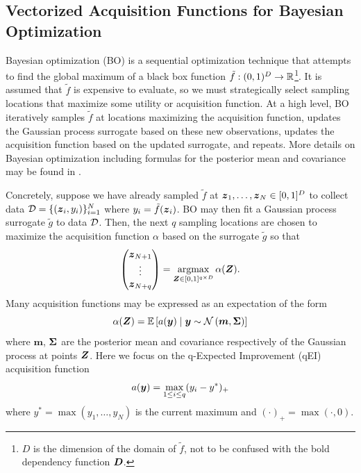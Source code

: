 \documentclass{article}[12pt]
\begin{document}



\subsection{Vectorized Acquisition Functions for Bayesian Optimization}

Bayesian optimization (BO) is a sequential optimization technique that attempts to find the global maximum of a black box function $\tilde{f}: (0,1)^{D} \to \mathbb{R}$\footnote{$D$ is the dimension of the domain of $\tilde{f}$, not to be confused with the bold dependency function $\boldsymbol{D}$.}. It is assumed that $\tilde{f}$ is expensive to evaluate, so we must strategically select sampling locations that maximize some utility or acquisition function. At a high level, BO iteratively samples $\tilde{f}$ at locations maximizing the acquisition function, updates the Gaussian process surrogate based on these new observations, updates the acquisition function based on the updated surrogate, and repeats. More details on Bayesian optimization including formulas for the posterior mean and covariance may be found in \cite{frazier2018tutorial}.

Concretely, suppose we have already sampled $\tilde{f}$ at $\boldsymbol{z}_1,\dots,\boldsymbol{z}_{N} \in [0,1]^{D}$ to collect data $\mathcal{D}=\{(\boldsymbol{z}_i,y_i)\}_{i=1}^N$ where $y_i = \tilde{f}(\boldsymbol{z}_i)$. BO may then fit a Gaussian process surrogate $\tilde{g}$ to data $\mathcal{D}$. Then, the next $q$ sampling locations are chosen to maximize  the acquisition function $\alpha$ based on the surrogate $\tilde{g}$ so that 
\begin{equation}
    \begin{pmatrix}\boldsymbol{z}_{N+1} \\ \vdots \\ \boldsymbol{z}_{N+q}\end{pmatrix} = \operatorname*{argmax}_{\boldsymbol{Z} \in [0,1]^{q \times D}}\alpha(\boldsymbol{Z}).
    \label{eq:nextq}
\end{equation}
Many acquisition functions may be expressed as an expectation of the form
$$\alpha(\boldsymbol{Z}) = \mathbb{E}\left[a(\boldsymbol{y}) \mid \boldsymbol{y} \sim \mathcal{N}\left(\boldsymbol{m},\boldsymbol{\Sigma}\right)\right]$$
where $\boldsymbol{m}$, $\boldsymbol{\Sigma}$ are the posterior mean and covariance respectively of the Gaussian process at points $\boldsymbol{Z}$. Here we focus on the q-Expected Improvement (qEI) acquisition function
$$a(\boldsymbol{y}) = \max_{1 \leq i \leq q} (y_i - y^*)_+$$
where $y^*= \max\left(y_1,\dots,y_N\right)$ is the current maximum and $(\cdot)_+ = \max(\cdot,0)$. 
\end{document}
